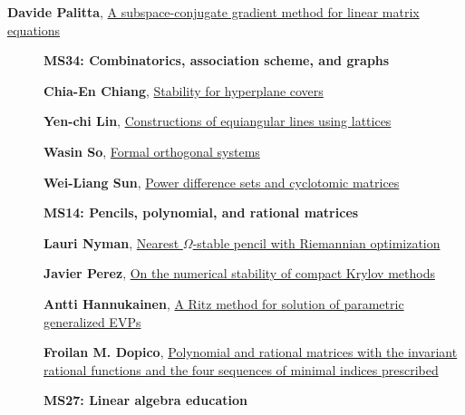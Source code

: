 \documentclass[ILAS2025-program.tex]{subfiles}
\begin{document}
\begin{description}
\begin{description}
{}
        \item[\info{15:00\textrm{--}15:30}] \hypertarget{up0322}{}\textbf{Davide Palitta}, \hyperlink{down0322}{A subspace-conjugate gradient method for linear matrix equations
}
        \end{description}
    \begin{description}
    \item[] {\color{mstitle}\textbf{MS34: Combinatorics, association scheme, and graphs}} 
    \item[] \hypertarget{up0323}{}\textbf{Chia-En Chiang}, \hyperlink{down0323}{Stability for hyperplane covers
}
        \item[] \hypertarget{up0324}{}\textbf{Yen-chi Lin}, \hyperlink{down0324}{Constructions of equiangular lines using lattices
}
        \item[] \hypertarget{up0325}{}\textbf{Wasin So}, \hyperlink{down0325}{Formal orthogonal systems}
        \item[] \hypertarget{up0326}{}\textbf{Wei-Liang Sun}, \hyperlink{down0326}{Power difference sets and cyclotomic matrices}
        \end{description}
    \begin{description}
    \item[] {\color{mstitle}\textbf{MS14: Pencils, polynomial, and rational matrices}} 
    \item[] \hypertarget{up0327}{}\textbf{Lauri Nyman}, \hyperlink{down0327}{Nearest $\Omega$-stable pencil with Riemannian optimization}
        \item[] \hypertarget{up0328}{}\textbf{Javier Perez}, \hyperlink{down0328}{On the numerical stability of compact Krylov methods}
        \item[] \hypertarget{up0329}{}\textbf{Antti Hannukainen}, \hyperlink{down0329}{A Ritz method for solution of parametric generalized EVPs}
        \item[] \hypertarget{up0330}{}\textbf{Froilan M. Dopico}, \hyperlink{down0330}{Polynomial and rational matrices with the invariant rational functions and the four sequences of minimal indices prescribed}
        \end{description}
    \begin{description}
    \item[] {\color{mstitle}\textbf{MS27: Linear algebra education}} 

\end{description}
\end{description}
\end{document}

